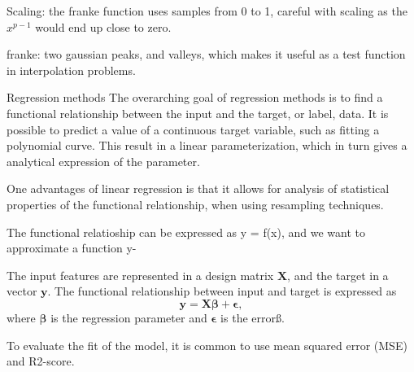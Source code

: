 Scaling: the franke function uses samples from 0 to 1, careful with scaling as the $x^{p-1}$ would end up close to zero. 

franke: two gaussian peaks, and valleys, which makes it useful as a test function in interpolation problems.

Regression methods
The overarching goal of regression methods is to find a functional relationship between the input and the target, or label, data. It is possible to predict a value of a continuous target variable, such as fitting a polynomial curve. This result in a linear parameterization, which in turn gives a analytical expression of the parameter. 

One advantages of linear regression is that it allows for analysis of statistical properties of the functional relationship, when using resampling techniques. 

The functional relatioship can be expressed as y = f(x), and we want to approximate a function y- 

The input features are represented in a design matrix $\mathbf{X}$, and the target in a vector $\mathbf{y}$. The functional relationship between input and target is expressed as
\begin{equation}
    \mathbf{y} = \mathbf{X} \mathbf{\beta} + \mathbf{\epsilon},
\end{equation}
where $\mathbf{\beta}$ is the regression parameter and $\mathbf{\epsilon}$ is the errorß.

To evaluate the fit of the model, it is common to use mean squared error (MSE) and R2-score.






